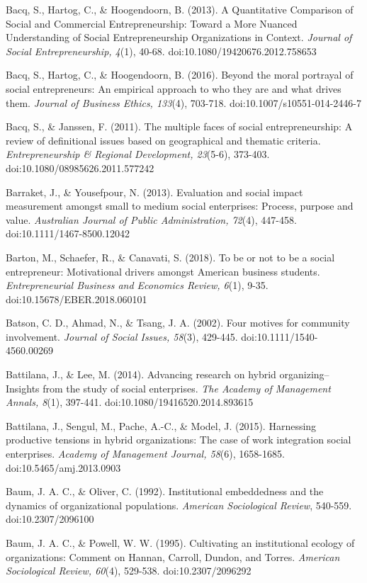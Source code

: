 \documentclass{article}
\begin{document}
Bacq, S., Hartog, C., \& Hoogendoorn, B. (2013). A Quantitative Comparison of Social and Commercial Entrepreneurship: Toward a More Nuanced Understanding of Social Entrepreneurship Organizations in Context. \emph{Journal of Social Entrepreneurship, 4}(1), 40-68. doi:10.1080/19420676.2012.758653

Bacq, S., Hartog, C., \& Hoogendoorn, B. (2016). Beyond the moral portrayal of social entrepreneurs: An empirical approach to who they are and what drives them. \emph{Journal of Business Ethics, 133}(4), 703-718. doi:10.1007/s10551-014-2446-7

Bacq, S., \& Janssen, F. (2011). The multiple faces of social entrepreneurship: A review of definitional issues based on geographical and thematic criteria. \emph{Entrepreneurship \& Regional Development, 23}(5-6), 373-403. doi:10.1080/08985626.2011.577242

Barraket, J., \& Yousefpour, N. (2013). Evaluation and social impact measurement amongst small to medium social enterprises: Process, purpose and value. \emph{Australian Journal of Public Administration, 72}(4), 447-458. doi:10.1111/1467-8500.12042

Barton, M., Schaefer, R., \& Canavati, S. (2018). To be or not to be a social entrepreneur: Motivational drivers amongst American business students. \emph{Entrepreneurial Business and Economics Review, 6}(1), 9-35. doi:10.15678/EBER.2018.060101

Batson, C. D., Ahmad, N., \& Tsang, J. A. (2002). Four motives for community involvement. \emph{Journal of Social Issues, 58}(3), 429-445. doi:10.1111/1540-4560.00269

Battilana, J., \& Lee, M. (2014). Advancing research on hybrid organizing--Insights from the study of social enterprises. \emph{The Academy of Management Annals, 8}(1), 397-441. doi:10.1080/19416520.2014.893615

Battilana, J., Sengul, M., Pache, A.-C., \& Model, J. (2015). Harnessing productive tensions in hybrid organizations: The case of work integration social enterprises. \emph{Academy of Management Journal, 58}(6), 1658-1685. doi:10.5465/amj.2013.0903

Baum, J. A. C., \& Oliver, C. (1992). Institutional embeddedness and the dynamics of organizational populations. \emph{American Sociological Review}, 540-559. doi:10.2307/2096100

Baum, J. A. C., \& Powell, W. W. (1995). Cultivating an institutional ecology of organizations: Comment on Hannan, Carroll, Dundon, and Torres. \emph{American Sociological Review, 60}(4), 529-538. doi:10.2307/2096292
\end{document}
